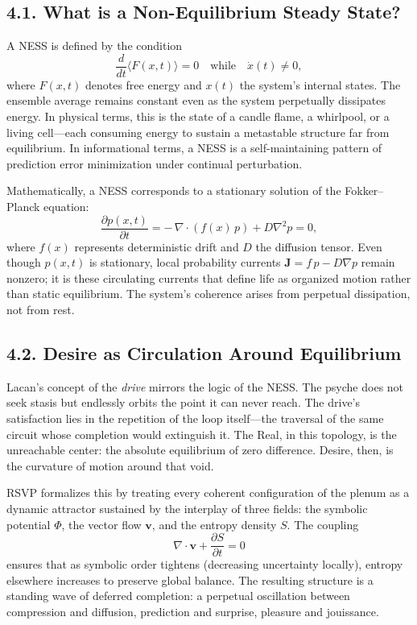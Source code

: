 \documentclass[12pt,a4paper]{article}
\begin{document}
\subsection{4.1. What is a Non-Equilibrium Steady State?}

A NESS is defined by the condition
\[
\frac{d}{dt}\langle F(x,t)\rangle = 0 \quad \text{while} \quad \dot{x}(t)\neq 0,
\]
where \(F(x,t)\) denotes free energy and \(x(t)\) the system’s internal states.  
The ensemble average remains constant even as the system perpetually dissipates energy.  
In physical terms, this is the state of a candle flame, a whirlpool, or a living cell—each consuming energy to sustain a metastable structure far from equilibrium.  
In informational terms, a NESS is a self-maintaining pattern of prediction error minimization under continual perturbation.

Mathematically, a NESS corresponds to a stationary solution of the Fokker–Planck equation:
\[
\frac{\partial p(x,t)}{\partial t} = -\,\nabla\!\cdot (f(x)\,p) + D\nabla^2 p = 0,
\]
where \(f(x)\) represents deterministic drift and \(D\) the diffusion tensor.  
Even though \(p(x,t)\) is stationary, local probability currents \(\mathbf{J} = f\,p - D\nabla p\) remain nonzero; it is these circulating currents that define life as organized motion rather than static equilibrium.  
The system’s coherence arises from perpetual dissipation, not from rest.

\subsection{4.2. Desire as Circulation Around Equilibrium}

Lacan’s concept of the \emph{drive} mirrors the logic of the NESS.  
The psyche does not seek stasis but endlessly orbits the point it can never reach.  
The drive’s satisfaction lies in the repetition of the loop itself—the traversal of the same circuit whose completion would extinguish it.  
The Real, in this topology, is the unreachable center: the absolute equilibrium of zero difference.  
Desire, then, is the curvature of motion around that void.

RSVP formalizes this by treating every coherent configuration of the plenum as a dynamic attractor sustained by the interplay of three fields: the symbolic potential \(\Phi\), the vector flow \(\mathbf{v}\), and the entropy density \(S\).  
The coupling
\[
\nabla\!\cdot\!\mathbf{v} + \frac{\partial S}{\partial t} = 0
\]
ensures that as symbolic order tightens (decreasing uncertainty locally), entropy elsewhere increases to preserve global balance.  
The resulting structure is a standing wave of deferred completion: a perpetual oscillation between compression and diffusion, prediction and surprise, pleasure and jouissance.
\end{document}
